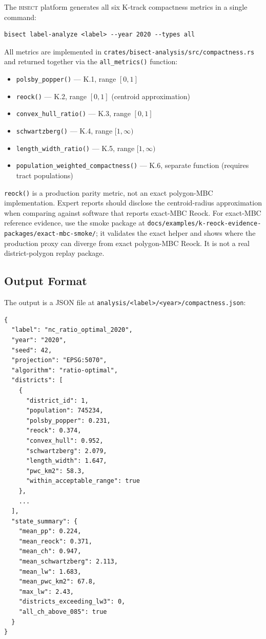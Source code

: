 The \textsc{bisect} platform generates all six K-track compactness metrics
in a single command:
\begin{verbatim}
bisect label-analyze <label> --year 2020 --types all
\end{verbatim}

All metrics are implemented in \texttt{crates/bisect-analysis/src/compactness.rs}
and returned together via the \texttt{all\_metrics()} function:
\begin{itemize}
  \item \texttt{polsby\_popper()} — K.1, range $[0,1]$
  \item \texttt{reock()} — K.2, range $[0,1]$ (centroid approximation)
  \item \texttt{convex\_hull\_ratio()} — K.3, range $[0,1]$
  \item \texttt{schwartzberg()} — K.4, range $[1,\infty)$
  \item \texttt{length\_width\_ratio()} — K.5, range $[1,\infty)$
  \item \texttt{population\_weighted\_compactness()} — K.6, separate function (requires tract populations)
\end{itemize}
\texttt{reock()} is a production parity metric, not an exact polygon-MBC
implementation.  Expert reports should disclose the centroid-radius approximation
when comparing against software that reports exact-MBC Reock.
For exact-MBC reference evidence, use the smoke package at
\texttt{docs/examples/k-reock-evidence-packages/exact-mbc-smoke/}; it validates
the exact helper and shows where the production proxy can diverge from exact
polygon-MBC Reock.  It is not a real district-polygon replay package.

\subsection{Output Format}

The output is a JSON file at \texttt{analysis/<label>/<year>/compactness.json}:
\begin{verbatim}
{
  "label": "nc_ratio_optimal_2020",
  "year": "2020",
  "seed": 42,
  "projection": "EPSG:5070",
  "algorithm": "ratio-optimal",
  "districts": [
    {
      "district_id": 1,
      "population": 745234,
      "polsby_popper": 0.231,
      "reock": 0.374,
      "convex_hull": 0.952,
      "schwartzberg": 2.079,
      "length_width": 1.647,
      "pwc_km2": 58.3,
      "within_acceptable_range": true
    },
    ...
  ],
  "state_summary": {
    "mean_pp": 0.224,
    "mean_reock": 0.371,
    "mean_ch": 0.947,
    "mean_schwartzberg": 2.113,
    "mean_lw": 1.683,
    "mean_pwc_km2": 67.8,
    "max_lw": 2.43,
    "districts_exceeding_lw3": 0,
    "all_ch_above_085": true
  }
}
\end{verbatim}

